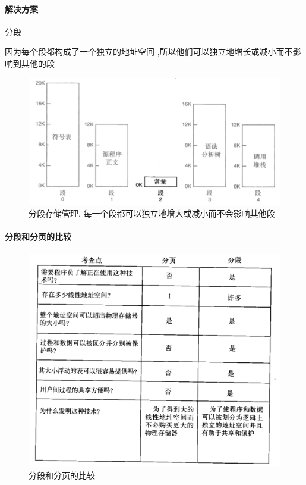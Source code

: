 \documentclass[UTF8,a4paper]{ctexart}
\begin{document}
\paragraph{解决方案} 分段

因为每个段都构成了一个独立的地址空间 ,所以他们可以独立地增长或减小而不影响到其他的段

\begin{figure}[H]
	\centering
	\includegraphics[scale = 0.4]{assets/ModernOperatingSystems/2018-01-10-23-27-27.png}
	\caption{分段存储管理, 每一个段都可以独立地增大或减小而不会影响其他段}
\end{figure}

\paragraph{分段和分页的比较} 
\begin{figure}[H]
	\centering
	\includegraphics[scale = 0.5]{assets/ModernOperatingSystems/2018-01-10-23-28-29.png}
	\caption{分段和分页的比较}
\end{figure}
\end{document}
